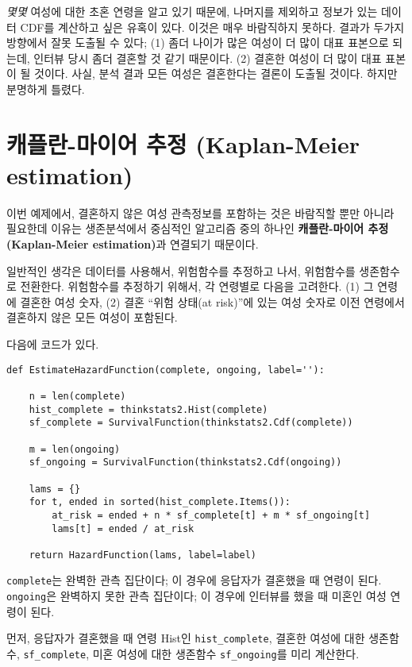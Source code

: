 
{\em 몇몇} 여성에 대한 초혼 연령을 알고 있기 때문에, 나머지를 제외하고 정보가 있는 데이터 CDF를 계산하고 싶은 유혹이 있다. 이것은 매우 바람직하지 못하다. 결과가 두가지 방향에서 잘못 도출될 수 있다; (1) 좀더 나이가 많은 여성이 더 많이 대표 표본으로 되는데, 인터뷰 당시 좀더 결혼할 것 같기 때문이다. (2) 결혼한 여성이 더 많이 대표 표본이 될 것이다. 사실, 분석 결과 모든 여성은 결혼한다는 결론이 도출될 것이다. 하지만 분명하게 틀렸다.


\section{캐플란-마이어 추정 (Kaplan-Meier estimation)}

이번 예제에서, 결혼하지 않은 여성 관측정보를 포함하는 것은 바람직할 뿐만 아니라 필요한데 이유는 생존분석에서 중심적인 알고리즘 중의 하나인 {\bf 캐플란-마이어 추정(Kaplan-Meier estimation)}과 연결되기 때문이다.

일반적인 생각은 데이터를 사용해서, 위험함수를 추정하고 나서, 위험함수를 생존함수로 전환한다. 위험함수를 추정하기 위해서, 각 연령별로 다음을 고려한다. (1) 그 연령에 결혼한 여성 숫자, (2) 결혼 ``위험 상태(at risk)''에 있는 여성 숫자로 이전 연령에서 결혼하지 않은 모든 여성이 포함된다.


다음에 코드가 있다.

\begin{verbatim}
def EstimateHazardFunction(complete, ongoing, label=''):

    n = len(complete)
    hist_complete = thinkstats2.Hist(complete)
    sf_complete = SurvivalFunction(thinkstats2.Cdf(complete))

    m = len(ongoing)
    sf_ongoing = SurvivalFunction(thinkstats2.Cdf(ongoing))

    lams = {}
    for t, ended in sorted(hist_complete.Items()):
        at_risk = ended + n * sf_complete[t] + m * sf_ongoing[t]
        lams[t] = ended / at_risk

    return HazardFunction(lams, label=label)
\end{verbatim}

{\tt complete}는 완벽한 관측 집단이다; 이 경우에 응답자가 결혼했을 때 연령이 된다. {\tt ongoing}은 완벽하지 못한 관측 집단이다; 이 경우에 인터뷰를 했을 때 미혼인 여성 연령이 된다.

먼저, 응답자가 결혼했을 때 연령 Hist인 \verb"hist_complete",
결혼한 여성에 대한 생존함수, \verb"sf_complete", 미혼 여성에 대한 생존함수 \verb"sf_ongoing"를 미리 계산한다.

